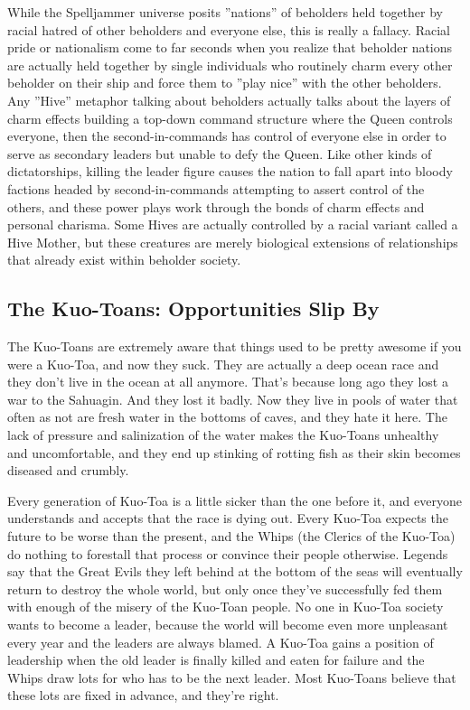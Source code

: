 While the Spelljammer universe posits ''nations'' of beholders held together by racial hatred of other beholders and everyone else, this is really a fallacy. Racial pride or nationalism come to far seconds when you realize that beholder nations are actually held together by single individuals who routinely charm every other beholder on their ship and force them to ''play nice'' with the other beholders. Any ''Hive'' metaphor talking about beholders actually talks about the layers of charm effects building a top-down command structure where the Queen controls everyone, then the second-in-commands has control of everyone else in order to serve as secondary leaders but unable to defy the Queen. Like other kinds of dictatorships, killing the leader figure causes the nation to fall apart into bloody factions headed by second-in-commands attempting to assert control of the others, and these power plays work through the bonds of charm effects and personal charisma. Some Hives are actually controlled by a racial variant called a Hive Mother, but these creatures are merely biological extensions of relationships that already exist within beholder society.

\subsection{The Kuo-Toans: Opportunities Slip By}

The Kuo-Toans are extremely aware that things used to be pretty awesome if you were a Kuo-Toa, and now they suck. They are actually a deep ocean race and they don't live in the ocean at all anymore. That's because long ago they lost a war to the Sahuagin. And they lost it badly. Now they live in pools of water that often as not are fresh water in the bottoms of caves, and they hate it here. The lack of pressure and salinization of the water makes the Kuo-Toans unhealthy and uncomfortable, and they end up stinking of rotting fish as their skin becomes diseased and crumbly.

Every generation of Kuo-Toa is a little sicker than the one before it, and everyone understands and accepts that the race is dying out. Every Kuo-Toa expects the future to be worse than the present, and the Whips (the Clerics of the Kuo-Toa) do nothing to forestall that process or convince their people otherwise. Legends say that the Great Evils they left behind at the bottom of the seas will eventually return to destroy the whole world, but only once they've successfully fed them with enough of the misery of the Kuo-Toan people. No one in Kuo-Toa society wants to become a leader, because the world will become even more unpleasant every year and the leaders are always blamed. A Kuo-Toa gains a position of leadership when the old leader is finally killed and eaten for failure and the Whips draw lots for who has to be the next leader. Most Kuo-Toans believe that these lots are fixed in advance, and they're right.

